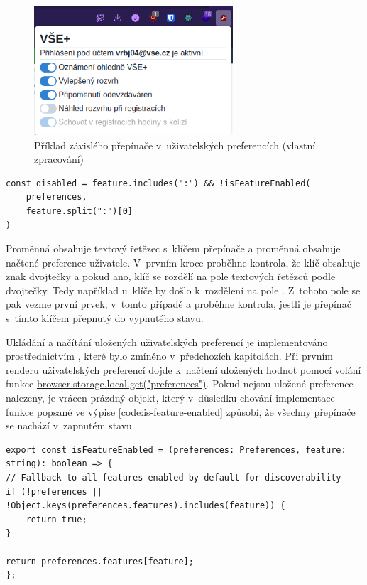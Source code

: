 \begin{figure}[H]\centering
    \includegraphics[width=0.66\textwidth]{img/zavisle-prepinace.png}
    \caption{Příklad závislého přepínače v~uživatelských preferencích (vlastní zpracování)}
    \label{fig:zavisle-prepinace}
\end{figure}

\begin{lstlisting}[label={code:user-preferences-disabled}, caption={Detekce stavu závislého přepínače (vlastní zpracování)}]
const disabled = feature.includes(":") && !isFeatureEnabled(
    preferences,
    feature.split(":")[0]
)
\end{lstlisting}

Proměnná  obsahuje textový řetězec s~klíčem přepínače a proměnná  obsahuje načtené preference uživatele. V~prvním kroce proběhne kontrola, že klíč obsahuje znak dvojtečky a pokud ano, klíč se rozdělí na pole textových řetězců podle dvojtečky. Tedy například u~klíče  by došlo k~rozdělení na pole . Z~tohoto pole se pak vezme první prvek, v~tomto případě  a proběhne kontrola, jestli je přepínač s~tímto klíčem přepnutý do vypnutého stavu.


Ukládání a načítání uložených uživatelských preferencí je implementováno prostřednictvím , které bylo zmíněno v~předchozích kapitolách. Při prvním renderu uživatelských preferencí dojde k~načtení uložených hodnot pomocí volání funkce \url{browser.storage.local.get("preferences")}. Pokud nejsou uložené preference nalezeny, je vrácen prázdný objekt, který v~důsledku chování implementace funkce  popsané ve výpise \ref{code:is-feature-enabled} způsobí, že všechny přepínače se nachází v~zapnutém stavu. 

\begin{lstlisting}[label={code:is-feature-enabled}, caption={Definice funkce \code{isFeatureEnabled} (vlastní zpracování).}]
export const isFeatureEnabled = (preferences: Preferences, feature: string): boolean => {
// Fallback to all features enabled by default for discoverability
if (!preferences || !Object.keys(preferences.features).includes(feature)) {
    return true;
}

return preferences.features[feature];
};
\end{lstlisting}

